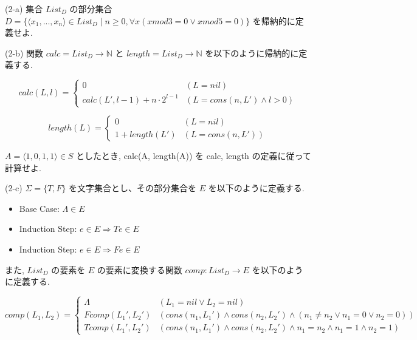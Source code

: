 \documentclass[12pt]{article}
\numberwithin{equation}{section}
\begin{document}
\begin{flushleft}
(2-a) 集合 \( List_D \) の部分集合 \( D = \{ \langle x_1,...,x_n \rangle \in List_D \mid n \geq 0, \forall x(x mod 3 = 0 \vee x mod 5 = 0) \} \) を帰納的に定義せよ. \\

\newpage

(2-b) 関数 \( calc = List_D \to \mathbb{N} \) と \( length = List_D \to \mathbb{N} \) を以下のように帰納的に定義する.

\[
    calc(L, l) = \begin{cases}
        0 & (L = nil) \\
        calc(L', l - 1) + n \cdot 2^{l-1} & (L = cons(n, L') \wedge l > 0)
    \end{cases}
\]

\[
    length(L) = \begin{cases}
        0 & (L = nil) \\
        1 + length(L') & (L = cons(n, L'))
    \end{cases}
\]

\( A = \langle 1, 0, 1, 1 \rangle \in S \) としたとき, calc(A, length(A)) を calc, length の定義に従って計算せよ.\\

\vspace{5mm}

(2-c) \( \Sigma = \{ T, F \} \) を文字集合とし、その部分集合を \( E \) を以下のように定義する.

\begin{itemize}
    \item Base Case: \( \Lambda \in E \)
    \item Induction Step: \( e \in E \Rightarrow Te \in E \)
    \item Induction Step: \( e \in E \Rightarrow Fe \in E \)
\end{itemize}

また, \( List_D \) の要素を \( E \) の要素に変換する関数 \( comp:List_D \to E \) を以下のように定義する.

\[
    comp(L_1, L_2) = \begin{cases}
        \Lambda & (L_1 = nil \vee L_2 = nil) \\
        Fcomp(L_1', L_2') & (cons(n_1, L_1') \wedge cons(n_2, L_2') \wedge (n_1 \neq n_2 \vee n_1 = 0 \vee n_2 = 0)) \\
        Tcomp(L_1', L_2') & (cons(n_1, L_1') \wedge cons(n_2, L_2') \wedge n_1 = n_2 \wedge n_1 = 1 \wedge n_2 = 1)
    \end{cases}
\]


\end{flushleft}
\end{document}

